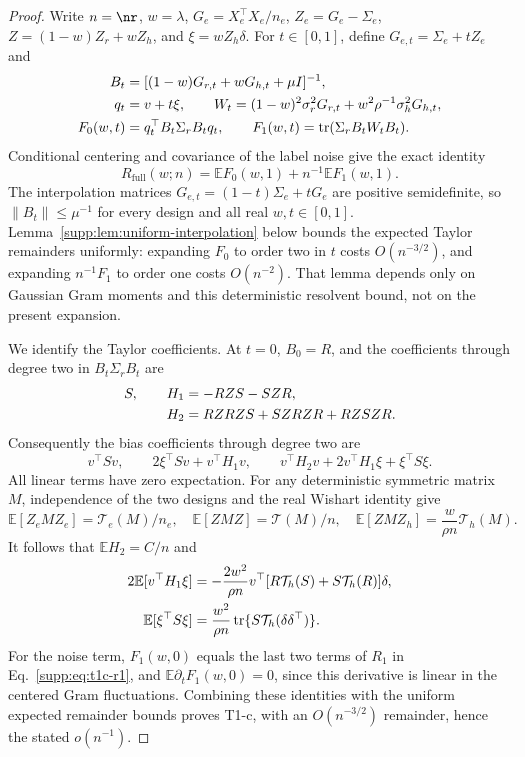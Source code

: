 \begin{proof}
Write $n=\nr$, $w=\lambda$, $G_e=X_e^\top X_e/n_e$, $Z_e=G_e-\Sigma_e$, $Z=(1-w)Z_r+wZ_h$, and $\xi=wZ_h\delta$. For $t\in[0,1]$, define $G_{e,t}=\Sigma_e+tZ_e$ and
\begin{align}
 B_t&=[(1-w)G_{r,t}+wG_{h,t}+\mu I]^{-1},\notag\\
 q_t&=v+t\xi,\qquad
 W_t=(1-w)^2\sigma_r^2G_{r,t}+w^2\rho^{-1}\sigma_h^2G_{h,t},\notag\\
 F_0(w,t)&=q_t^\top B_t\Sigma_rB_tq_t,\qquad
 F_1(w,t)=\operatorname{tr}(\Sigma_rB_tW_tB_t).
 \label{supp:eq:interpolation-risk}
\end{align}
Conditional centering and covariance of the label noise give the exact identity
\begin{equation}
 R_{\mathrm{full}}(w;n)=\mathbb E F_0(w,1)+n^{-1}\mathbb E F_1(w,1).
 \label{supp:eq:t1c-exact}
\end{equation}
The interpolation matrices $G_{e,t}=(1-t)\Sigma_e+tG_e$ are positive semidefinite, so $\|B_t\|\le\mu^{-1}$ for every design and all real $w,t\in[0,1]$. Lemma~\ref{supp:lem:uniform-interpolation} below bounds the expected Taylor remainders uniformly: expanding $F_0$ to order two in $t$ costs $O(n^{-3/2})$, and expanding $n^{-1}F_1$ to order one costs $O(n^{-2})$. That lemma depends only on Gaussian Gram moments and this deterministic resolvent bound, not on the present expansion.

We identify the Taylor coefficients. At $t=0$, $B_0=R$, and the coefficients through degree two in $B_t\Sigma_rB_t$ are
\begin{align}
 S,\qquad H_1&=-RZS-SZR,\notag\\
 H_2&=RZRZS+SZRZR+RZ S ZR.
\end{align}
Consequently the bias coefficients through degree two are
\begin{equation}
 v^\top Sv,\qquad 2\xi^\top Sv+v^\top H_1v,\qquad
 v^\top H_2v+2v^\top H_1\xi+\xi^\top S\xi.
\end{equation}
All linear terms have zero expectation. For any deterministic symmetric matrix $M$, independence of the two designs and the real Wishart identity give
\begin{equation}
 \mathbb E[Z_eMZ_e]=\mathcal T_e(M)/n_e,\quad
 \mathbb E[ZMZ]=\mathcal T(M)/n,\quad
 \mathbb E[ZMZ_h]=\frac{w}{\rho n}\mathcal T_h(M).
\end{equation}
It follows that $\mathbb E H_2=C/n$ and
\begin{align}
 2\mathbb E[v^\top H_1\xi]
 &=-\frac{2w^2}{\rho n}v^\top[R\mathcal T_h(S)+S\mathcal T_h(R)]\delta,\notag\\
 \mathbb E[\xi^\top S\xi]
 &=\frac{w^2}{\rho n}\operatorname{tr}\{S\mathcal T_h(\delta\delta^\top)\}.
\end{align}
For the noise term, $F_1(w,0)$ equals the last two terms of $R_1$ in Eq.~\eqref{supp:eq:t1c-r1}, and $\mathbb E\partial_tF_1(w,0)=0$, since this derivative is linear in the centered Gram fluctuations. Combining these identities with the uniform expected remainder bounds proves T1-c, with an $O(n^{-3/2})$ remainder, hence the stated $o(n^{-1})$.
\end{proof}

